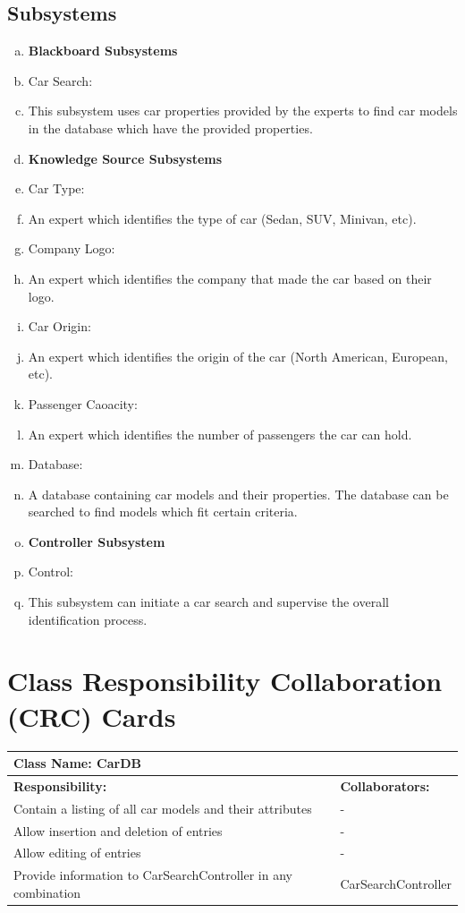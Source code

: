 \documentclass[12pt]{article}
\begin{document}
\subsection{Subsystems}
\label{sub:subsystems}
\begin{enumerate}[a)]
	\item {\textbf{Blackboard Subsystems}}
	\item Car Search:
	\item This subsystem uses car properties provided by the experts to find car models in the database which have the provided properties.
	\item {\textbf{Knowledge Source Subsystems}}
	\item Car Type:
	\item An expert which identifies the type of car (Sedan, SUV, Minivan, etc).
	\item Company Logo:
	\item An expert which identifies the company that made the car based on their logo.
	\item Car Origin:
	\item An expert which identifies the origin of the car (North American, European, etc).
	\item Passenger Caoacity:
	\item An expert which identifies the number of passengers the car can hold.
	\item Database:
	\item A database containing car models and their properties. The database can be searched to find models which fit certain criteria.
	\item {\textbf{Controller Subsystem}}
	\item Control:
	\item This subsystem can initiate a car search and supervise the overall identification process.
\end{enumerate}


\section{Class Responsibility Collaboration (CRC) Cards}
\label{sec:class_responsibility_collaboration_crc_cards}

	\begin{table}[ht]
		\centering
		\begin{tabular}{|p{5cm}|p{5cm}|}
		\hline
		 \multicolumn{2}{|l|}{\textbf{Class Name:} CarDB} \\
		\hline
		\textbf{Responsibility:} & \textbf{Collaborators:} \\
		\hline
		Contain a listing of all car models and their attributes & -\\
		\hline
		Allow insertion and deletion of entries & -\\
		\hline
		Allow editing of entries & - \\
		\hline
		Provide information to CarSearchController in any combination & CarSearchController \\
		\hline
		\end{tabular}
	\end{table}
\end{document}

